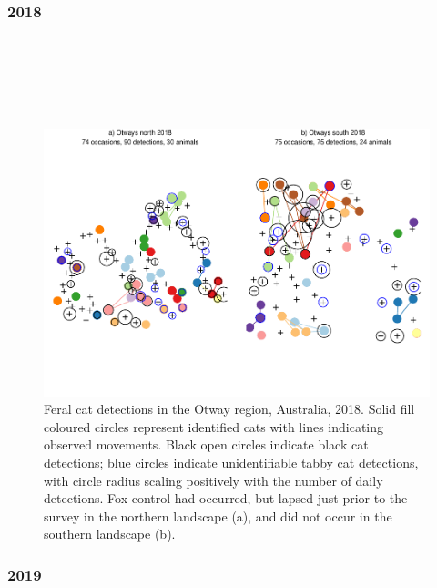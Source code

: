 \documentclass[11pt,a4paper,titlepage,twoside,openright]{style/unimelbthesis}
\begin{document}
\begin{mainmatter}
\hypertarget{section-1}{%
\subsubsection{2018}\label{section-1}}

\(~\)

\(~\)

\(~\)
\begin{figure}

{\centering \includegraphics[width=1\linewidth]{figure/density-plot-ch-5-1} 

}

\caption{Feral cat detections in the Otway region, Australia, 2018. Solid fill coloured circles represent identified cats with lines indicating observed movements. Black open circles indicate black cat detections; blue circles indicate unidentifiable tabby cat detections, with circle radius scaling positively with the number of daily detections. Fox control had occurred, but lapsed just prior to the survey in the northern landscape (a), and did not occur in the southern landscape (b).}\label{fig:density-plot-ch-5}
\end{figure}
\newpage

\hypertarget{section-2}{%
\subsubsection{2019}\label{section-2}}

\(~\)

\(~\)

\(~\)
\begin{figure}


\end{figure}
\end{mainmatter}
\end{document}
